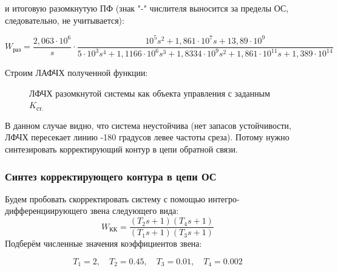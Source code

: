 \documentclass[main.tex]{subfiles}
\begin{document}
и итоговую разомкнутую ПФ (знак "-" числителя выносится за пределы ОС, 
следовательно, не учитывается):

 \[ W_\text{раз} = \frac{2,063 \cdot 10^{6}}{s}\cdot
    \frac{10^5s^2+1,861 \cdot 10^{7}s+13,89 \cdot 10^{9}}
    {5 \cdot 10^{3}s^4 + 1,1166 \cdot 10^{6}s^3 + 1,8334 \cdot 10^{9}s^2 + 
    1,861 \cdot 10^{11}s + 1,389 \cdot 10^{14}}
 \]

 Строим ЛАФЧХ полученной функции:
 \begin{figure}[h]
     \caption{ЛФЧХ разомкнутой системы как объекта управления с заданным \( K_\text{ст.} \)}
 \end{figure}

В данном случае видно, что система неустойчива (нет запасов устойчивости, ЛФЧХ пересекает
линию -180 градусов левее частоты среза). Потому нужно синтезировать 
корректирующий контур в цепи обратной связи.

\subsubsection*{Синтез корректирующего контура в цепи ОС}
Будем пробовать скорректировать систему с помощью интегро-дифференциирующего звена
следующего вида:
 \[ W_\text{КК} = \frac{(T_2s+1)(T_4s+1)}{(T_1s+1)(T_3s+1)} \]
 Подберём численные значения коэффициентов звена:

 \[ T_1 = 2,\quad T_2 = 0.45, \quad T_3 = 0.01, \quad T_4 = 0.002 \]
\end{document}
